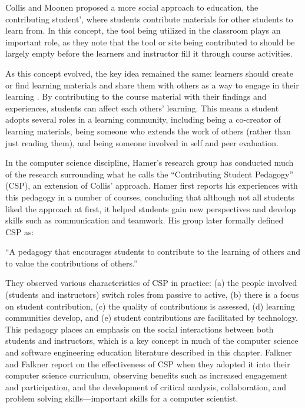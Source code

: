 Collis and Moonen \cite{collis2001flexible} proposed a more social approach to education, the contributing student', where students contribute materials for other students to learn from. In this concept, the tool being utilized in the classroom plays an important role, as they note that the tool or site being contributed to should be largely empty before the learners and instructor fill it through course activities.

As this concept evolved, the key idea remained the same: learners should create or find learning materials and share them with others as a way to engage in their learning \cite{collis2006contributing}. By contributing to the course material with their findings and experiences, students can affect each others' learning. This means a student adopts several roles in a learning community, including being a co-creator of learning materials, being someone who extends the work of others (rather than just reading them), and being someone involved in self and peer evaluation.

In the computer science discipline, Hamer's research group has conducted much of the research surrounding what he calls the ``Contributing Student Pedagogy'' (CSP), an extension of Collis' approach. Hamer first reports his experiences \cite{hamer2006some} with this pedagogy in a number of courses, concluding that although not all students liked the approach at first, it helped students gain new perspectives and develop skills such as communication and teamwork. His group later formally defined CSP \cite{hamer2008contributing} as:

``A pedagogy that encourages students to contribute to the learning of others and to value the contributions of others.''

They observed various characteristics of CSP in practice: (a) the people involved (students and instructors) switch roles from passive to active, (b) there is a focus on student contribution, (c) the quality of contributions is assessed, (d) learning communities develop, and (e) student contributions are facilitated by technology. This pedagogy places an emphasis on the social interactions between both students and instructors, which is a key concept in much of the computer science and software engineering education literature described in this chapter. Falkner and Falkner \cite{falkner2012supporting} report on the effectiveness of CSP when they adopted it into their computer science curriculum, observing benefits such as increased engagement and participation, and the development of critical analysis, collaboration, and problem solving skills---important skills for a computer scientist.

